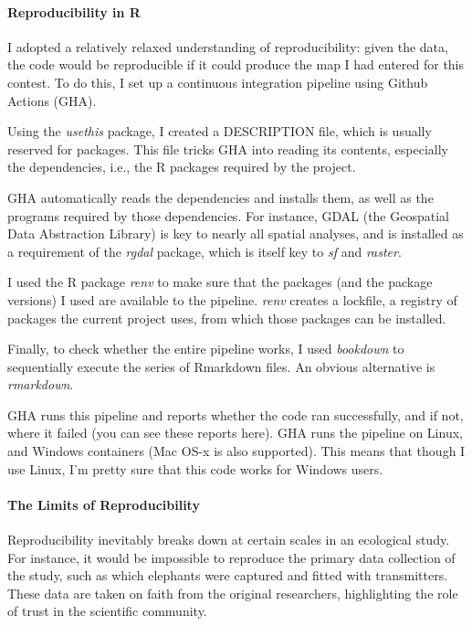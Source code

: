 	\medskip

	\paragraph*{Reproducibility in R}

	I adopted a relatively relaxed understanding of reproducibility: given the data, the code would be reproducible if it could produce the map I had entered for this contest. To do this, I set up a continuous integration pipeline using Github Actions (GHA).

	Using the \textit{usethis} package, I created a DESCRIPTION file, which is usually reserved for packages. This file tricks GHA into reading its contents, especially the dependencies, i.e., the R packages required by the project.

	GHA automatically reads the dependencies and installs them, as well as the programs required by those dependencies. For instance, GDAL (the Geospatial Data Abstraction Library) is key to nearly all spatial analyses, and is installed as a requirement of the \textit{rgdal} package, which is itself key to \textit{sf} and \textit{raster}.

	I used the R package \textit{renv} to make sure that the packages (and the package versions) I used are available to the pipeline. \textit{renv} creates a lockfile, a registry of packages the current project uses, from which those packages can be installed.

	Finally, to check whether the entire pipeline works, I used \textit{bookdown} to sequentially execute the series of Rmarkdown files. An obvious alternative is \textit{rmarkdown}.

	GHA runs this pipeline and reports whether the code ran successfully, and if not, where it failed (you can see these reports here). GHA runs the pipeline on Linux, and Windows containers (Mac OS-x is also supported). This means that though I use Linux, I'm pretty sure that this code works for Windows users.

	\medskip

	\paragraph*{The Limits of Reproducibility}

	Reproducibility inevitably breaks down at certain scales in an ecological study. For instance, it would be impossible to reproduce the primary data collection of the study, such as which elephants were captured and fitted with transmitters. These data are taken on faith from the original researchers, highlighting the role of trust in the scientific community.

